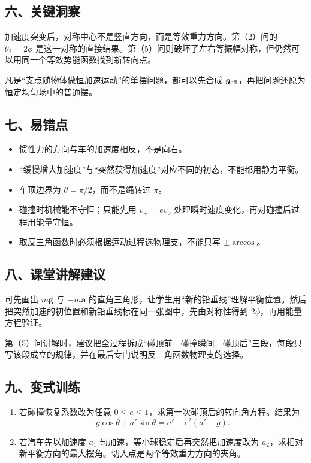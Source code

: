 \documentclass[12pt,a4paper,UTF8]{ctexart}
\newcommand{\tightlist}{\setlength{\itemsep}{0pt}\setlength{\parskip}{0pt}}
\begin{document}
\subsection{六、关键洞察}\label{ux516dux5173ux952eux6d1eux5bdf}

加速度突变后，对称中心不是竖直方向，而是等效重力方向。第（2）问的
\(\theta_2=2\phi\)
是这一对称的直接结果。第（5）问则破坏了左右等振幅对称，但仍然可以用同一个等效势能函数找到新转向点。

凡是``支点随物体做恒加速运动''的单摆问题，都可以先合成
\(\bm g_{\rm eff}\)，再把问题还原为恒定均匀场中的普通摆。

\subsection{七、易错点}\label{ux4e03ux6613ux9519ux70b9}

\begin{itemize}
\tightlist
\item
  惯性力的方向与车的加速度相反，不是向右。
\item
  ``缓慢增大加速度''与``突然获得加速度''对应不同的初态，不能都用静力平衡。
\item
  车顶边界为 \(\theta=\pi/2\)，而不是绳转过 \(\pi\)。
\item
  碰撞时机械能不守恒；只能先用 \(v_+=ev_0\)
  处理瞬时速度变化，再对碰撞后过程用能量守恒。
\item
  取反三角函数时必须根据运动过程选物理支，不能只写 \(\pm\arccos\)。
\end{itemize}

\subsection{八、课堂讲解建议}\label{ux516bux8bfeux5802ux8bb2ux89e3ux5efaux8bae}

可先画出 \(m\bm g\) 与 \(-m\bm a\)
的直角三角形，让学生用``新的铅垂线''理解平衡位置。然后把突然加速的初位置和新铅垂线标在同一张图中，先由对称性得到
\(2\phi\)，再用能量方程验证。

第（5）问讲解时，建议把全过程拆成``碰顶前---碰撞瞬间---碰顶后''三段，每段只写该段成立的规律，并在最后专门说明反三角函数物理支的选择。

\subsection{九、变式训练}\label{ux4e5dux53d8ux5f0fux8badux7ec3}

\begin{enumerate}
\def\labelenumi{\arabic{enumi}.}
\tightlist
\item
  若碰撞恢复系数改为任意
  \(0\leq e\leq1\)，求第一次碰顶后的转向角方程。结果为
  \[g\cos\theta+a'\sin\theta
  =a'-e^2(a'-g).\]
\item
  若汽车先以加速度 \(a_1\) 匀加速，等小球稳定后再突然把加速度改为
  \(a_2\)，求相对新平衡方向的最大摆角。切入点是两个等效重力方向的夹角。
\end{enumerate}
\end{document}
